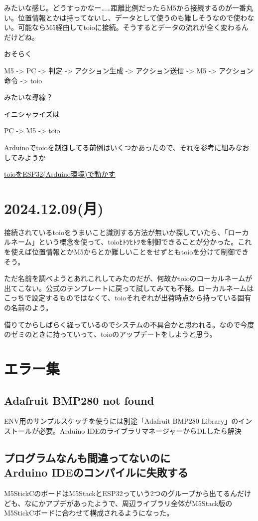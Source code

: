\documentclass[fleqn,twocolumn]{mynote}
\begin{document}
みたいな感じ。どうすっかなー……距離比例だったらM5から接続するのが一番丸い。位置情報とかは持ってないし、データとして使うのも難しそうなので使わない。可能ならM5経由してtoioに接続。そうするとデータの流れが全く変わるんだけどね。

おそらく

M5 -> PC -> 判定 -> アクション生成 -> アクション送信 -> M5 -> アクション命令 -> toio

みたいな導線？

イニシャライズは

PC -> M5 -> toio

Arduinoでtoioを制御してる前例はいくつかあったので、それを参考に組みなおしてみようか

\href{https://note.com/vhideo/n/nff5e2845beb1}{toioをESP32(Arduino環境)で動かす}

\section*{2024.12.09(月)}
接続されているtoioをうまいこと識別する方法が無いか探していたら、「ローカルネーム」という概念を使って、toioﾋﾄﾂﾋﾄﾂを制御できることが分かった。これを使えば位置情報とかM5からとか難しいことをせずともtoioを分けて制御できそう。

ただ名前を調べようとあれこれしてみたのだが、何故かtoioのローカルネームが出てこない。公式のテンプレートに戻って試してみても不発。ローカルネームはこっちで設定するものではなくて、toioそれぞれが出荷時点から持っている固有の名前のよう。

借りてからしばらく経っているのでシステムの不具合かと思われる。なので今度のゼミのときに持っていって、toioのアップデートをしようと思う。
\section*{エラー集}
\subsection*{Adafruit BMP280 not found}
ENV用のサンプルスケッチを使うには別途「Adafruit BMP280 Library」のインストールが必要。Arduino IDEのライブラリマネージャーからDLしたら解決

\subsection*{プログラムなんも間違ってないのに\\Arduino IDEのコンパイルに失敗する}
M5StickCのボードはM5StackとESP32っていう2つのグループから出てるんだけども、なにかアプデがあったようで、周辺ライブラリ全体がM5Stack版のM5StickCボードに合わせて構成されるようになった。
\end{document}

